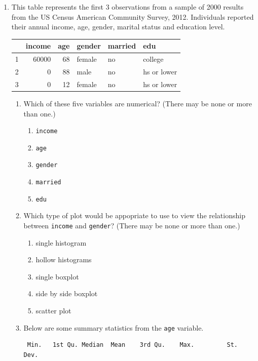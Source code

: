 \documentclass[12pt,fullpage]{amsart}
\begin{document}
\begin{enumerate}
\item
This table represents the first 3 observations from a sample of 2000 results from the US Census American Community Survey, 2012. Individuals reported their annual income, age, gender, marital status and education level.
\begin{table}[ht]
\centering
\begin{tabular}{rrrlll}
  \hline
 & income & age & gender & married & edu \\ 
  \hline
1 & 60000 &  68 & female & no & college \\ 
  2 &   0 &  88 & male & no & hs or lower \\ 
  3 &  0 &  12 & female & no & hs or lower \\ 
   \hline
\end{tabular}
\end{table}
\begin{enumerate}
\item Which of these five variables are numerical? (There may be none or more than one.)
  \begin{multicols}{3}
  \begin{enumerate}
  \item \texttt{income}
  \item \texttt{age}
  \item  \texttt{gender}
  \item \texttt{married}
  \item \texttt{edu}
  \end{enumerate}
  \end{multicols}
\item Which type of plot would be appopriate to use to view the relationship between \texttt{income} and \texttt{gender}? (There may be none or more than one.)
  \begin{multicols}{3}
\begin{enumerate}
\item single histogram
\item hollow histograms
\item single boxplot
\item side by side boxplot
\item scatter plot
\end{enumerate}
  \end{multicols}
\item
Below are some summary statistics from the \texttt{age} variable.
\begin{verbatim}
 Min.   1st Qu. Median  Mean    3rd Qu.    Max.         St. Dev.

\end{verbatim}
\end{enumerate}
\end{enumerate}
\end{document}
